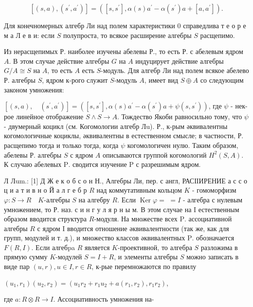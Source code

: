 \documentclass[10pt]{article}
\begin{document}
\[

\left[(s, a),\left(s^{\prime}, a^{\prime}\right)\right]=\left(\left[s, s^{\prime}\right], \alpha(s) a^{\prime}-\alpha\left(s^{\prime}\right) a+\left[a, a^{\prime}\right]\right) .

\]



Для конечномерных алгебр Ли над полем характеристики 0 справедлива т е о р е м а Л е в и: если $S$ полупроста, то всякое расширение алгебры $S$ расщепимо.



Из нерасщепимых Р. наиболее изучены абелевы Р., то есть Р. с абелевым ядром $A$. В этом случае действие алгебры $G$ на $A$ индуцирует действие алгебры $G / A \cong S$ на $A$, то есть $A$ есть $S$-модуль. Для алгебр Ли над полем всякое абелево Р. алгебры $S$, ядром к-рого служит $S$-модуль $A$, имеет вид $S \oplus A$ со следующим законом умножения:



$\left[(s, a), \quad\left(s^{\prime}, a^{\prime}\right)\right]=\left(\left[s, s^{\prime}\right], \alpha(s) a^{\prime}-\alpha\left(s^{\prime}\right) a+\psi\left(s, s^{\prime}\right)\right)$, где $\psi$ - нек-рое линейное отображение $S \wedge S \rightarrow A$. Тождество Якоби равносильно тому, что $\psi$ - двумерный коцикл (см. Когомологии алгебр Лu). Р., к-рым әквивалентны когомологичные коциклы, әквивалентны в естественном смысле; в частности, Р. расщепимо тогда и только тогда, когда $\psi$ когомологичен нулю. Таким образом, абелевы Р. алгебры $S$ с ядром $A$ описываются группой когомологий $H^{2}(S, A)$. К случаю абелевых $\mathrm{P}$. сводится изучение $\mathrm{P}$ с разрешимым ядром.



Л Лum.: [1] Д Ж е к о б с о н Н., Алгебры Ли, пер. с англ, РАСІІИРЕНИЕ а с с о ц и а т и в н о Й а л $г$ е б р $R$ над коммутативным кольцом $K$ - гомоморфизм $\varphi: S \rightarrow R \quad K$-алгебры $S$ на алгебру $R$. Если $\operatorname{Ker} \varphi=$ $=I$ - алгебра с нулевым умножением, то Р. наз. с и н г у л я р н ы м. В этом случае на I естественным образом вводится структура $R$-модуля. На множестве всех $\mathrm{P}$. ассоциативной алгебры $R$ с ядром I вводится отношение әквивалентности (так же, как для групп, модулей и т. д.), и множество классов әквивалентных $\mathrm{P}$. обозначается $F(R, I)$. Если алгебpa $R$ является $K$-проективной, то алгебра $S$ разложима в прямую сумму $K$-модулей $S=I+R$, и элементы алгебры $S$ можно записать в виде пар $(u, r), u \in I, r \in R$, к-рые перемножаются по правилу



$\left(u_{1}, r_{1}\right)\left(u_{2}, r_{2}\right)=\left(u_{1} r_{2}+r_{1} u_{2}+a\left(r_{1}, r_{2}\right), r_{1} r_{2}\right)$,



где $a: R \otimes R \rightarrow I$. Ассоциативность умножения на-
\end{document}
